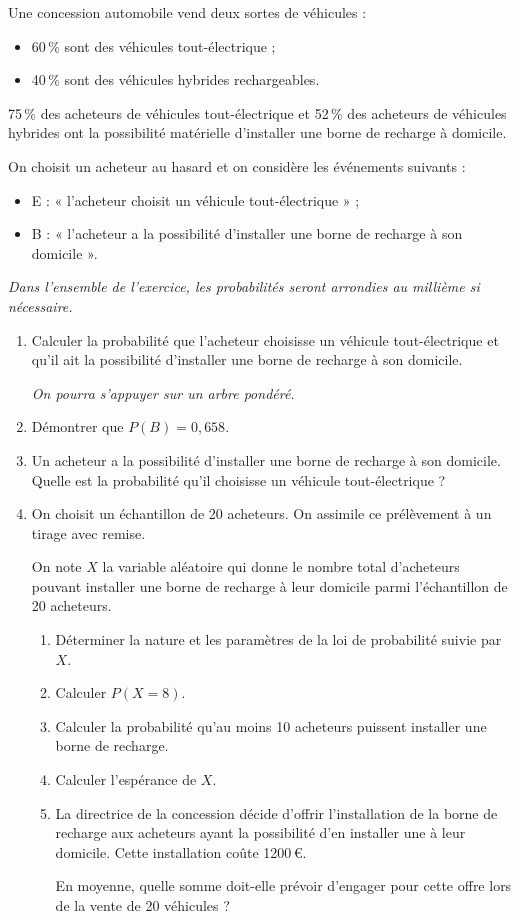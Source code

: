 Une concession automobile vend deux sortes de véhicules :

\begin{itemize}
	\item 60\,\% sont des véhicules tout-électrique ;
	\item 40\,\% sont des véhicules hybrides rechargeables.
\end{itemize}

75\,\% des acheteurs de véhicules tout-électrique et 52\,\% des acheteurs de véhicules hybrides ont la possibilité matérielle d’installer une borne de recharge à domicile.

\smallskip

On choisit un acheteur au hasard et on considère les événements suivants :

\begin{itemize}
	\item E : « l’acheteur choisit un véhicule tout-électrique » ;
	\item B : « l’acheteur a la possibilité d’installer une borne de recharge à son domicile ».
\end{itemize}

\textit{Dans l’ensemble de l’exercice, les probabilités seront arrondies au millième si nécessaire.}

\begin{enumerate}
	\item Calculer la probabilité que l’acheteur choisisse un véhicule tout-électrique et qu’il ait la possibilité d’installer une borne de recharge à son domicile.
	
	\textit{On pourra s’appuyer sur un arbre pondéré.}
	\item Démontrer que $P(B) = 0,658$.
	\item Un acheteur a la possibilité d’installer une borne de recharge à son domicile. Quelle est la probabilité qu'il choisisse un véhicule tout-électrique ?
	\item On choisit un échantillon de 20 acheteurs. On assimile ce prélèvement à un tirage avec remise.
	
	On note $X$ la variable aléatoire qui donne le nombre total d’acheteurs pouvant installer une borne de recharge à leur domicile parmi l’échantillon de 20 acheteurs.
	\begin{enumerate}
		\item Déterminer la nature et les paramètres de la loi de probabilité suivie par $X$.
		\item Calculer $P(X = 8)$.
		\item Calculer la probabilité qu’au moins 10 acheteurs puissent installer une borne de recharge.
		\item Calculer l’espérance de $X$.
		\item La directrice de la concession décide d’offrir l’installation de la borne de recharge aux acheteurs ayant la possibilité d’en installer une à leur domicile. Cette installation coûte \num{1200}\,€.
		
		En moyenne, quelle somme doit-elle prévoir d’engager pour cette offre lors de la vente de 20 véhicules ?
	\end{enumerate}
\end{enumerate}